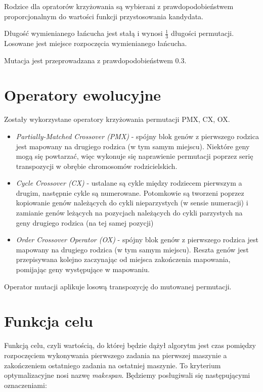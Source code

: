\documentclass[12pt]{article}
\begin{document}
Rodzice dla opratorów krzyżowania są wybierani z prawdopodobieństwem
proporcjonalnym do wartości funkcji przystosowania kandydata.

Długość wymienianego łańcucha jest stałą i wynosi $\frac{1}{3}$ długości
permutacji. Losowane jest miejsce rozpoczęcia wymienianego łańcucha.

Mutacja jest przeprowadzana z prawdopodobieństwem 0.3.

\section{Operatory ewolucyjne}

Zostały wykorzystane operatory krzyżowania permutacji PMX, CX, OX.

\begin{itemize}
  \item {\em Partially-Matched Crossover (PMX)} - spójny blok genów z pierwszego rodzica jest mapowany na drugiego rodzica (w tym samym miejscu).
        Niektóre geny mogą się powtarzać, więc wykonuje się naprawienie permutacji poprzez serię transpozycji w obrębie chromosomów rodzicielskich.
  \item {\em Cycle Crossover (CX)} - ustalane są cykle między rodziecem pierwszym a drugim, następnie cykle są numerowane. Potomkowie są tworzeni poprzez
        kopiowanie genów należących do cykli nieparzystych (w sensie numeracji) i zamianie genów leżących na pozycjach należących do cykli 
        parzystych na geny drugiego rodzica (na tej samej pozycji)
  \item {\em Order Crossover Operator (OX)} - spójny blok genów z pierwszego rodzica jest mapowany na drugiego rodzica (w tym samym miejscu). Reszta genów jest
        przepisywana kolejno zaczynając od miejsca zakończenia mapowania, pomijając geny występujące w mapowaniu.
\end{itemize}

\noindent Operator mutacji aplikuje losową transpozycję do mutowanej permutacji.

\section{Funkcja celu}

Funkcją celu, czyli wartością, do której będzie dążył algorytm jest czas
pomiędzy rozpoczęciem wykonywania pierwszego zadania na pierwszej maszynie a
zakończeniem ostatniego zadania na ostatniej maszynie. To kryterium optymalizacyjne
nosi nazwę {\em makespan}. Będziemy posługiwali się następującymi oznaczeniami:
\end{document}
